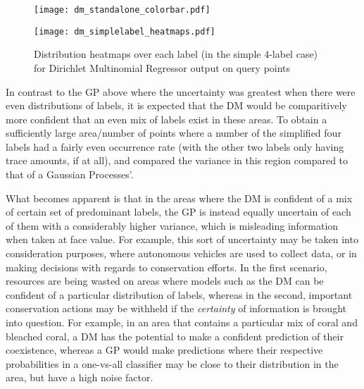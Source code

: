 
\begin{figure}[H]
    \begin{minipage}{\linewidth}
        \centerline{\texttt{[image: dm\_standalone\_colorbar.pdf]}}
        \centerline{\texttt{[image: dm\_simplelabel\_heatmaps.pdf]}}
        \caption{Distribution heatmaps over each label (in the simple 4-label case) for Dirichlet Multinomial Regressor output on query points}
        \label{fig:dm_4label_heatmap}
    \end{minipage}
    \hfill
\end{figure}

In contrast to the GP above where the uncertainty was greatest when there were even distributions of labels, it is expected that the DM would be comparitively more confident that an even mix of labels exist in these areas.  To obtain a sufficiently large area/number of points where a number of the simplified four labels had a fairly even occurrence rate (with the other two labels only having trace amounts, if at all), and compared the variance in this region compared to that of a Gaussian Processes'.

What becomes apparent is that in the areas where the DM is confident of a mix of certain set of predominant labels, the GP is instead equally uncertain of each of them with a considerably higher variance, which is misleading information when taken at face value. For example, this sort of uncertainty may be taken into consideration purposes, where autonomous vehicles are used to collect data, or in making decisions with regards to conservation efforts. In the first scenario, resources are being wasted on areas where models such as the DM can be confident of a particular distribution of labels, whereas in the second, important conservation actions may be withheld if the \textit{certainty} of information is brought into question. For example, in an area that contains a particular mix of coral and bleached coral, a DM has the potential to make a confident prediction of their coexistence, whereas a GP would make predictions where their respective probabilities in a one-vs-all classifier may be close to their distribution in the area, but have a high noise factor.


